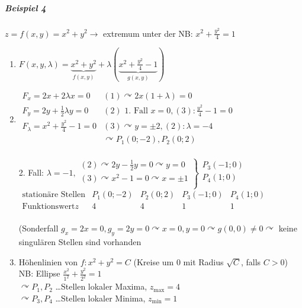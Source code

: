 \documentclass[a4paper]{scrartcl}
\begin{document}
\begin{enumerate}
\subparagraph{Beispiel 4} $z=f(x,y) = x^2 + y^2 \rightarrow$ extremum unter der NB: $x^2 + \frac{y^2}{4} = 1$
\begin{enumerate}
\item $F(x,y,\lambda) = \underbrace{x^2+y^2}_{f(x,y)} + \lambda (\underbrace{x^2 + \frac{y^2}{4} -1}_{g(x,y)})$
\item $\begin{array}{c|r}
F_x = 2x + 2\lambda x = 0 & (1) \curvearrowright 2x (1 + \lambda ) = 0\\
F_y = 2y + \frac{1}{2} \lambda y = 0 & (2) \text{ 1. Fall } x=0, (3): \frac{y^2}{4} -1 = 0\\
F_\lambda = x^2 + \frac{y^2}{4} -1 =0 & (3) \curvearrowright y = \pm 2, (2): \lambda = -4\\
 & \curvearrowright P_1(0;-2),P_2(0;2)\\
\end{array}$

2. Fall: $\lambda = -1, \left. \begin{array}{c} (2) \curvearrowright 2y - \frac{1}{2} y=0 \curvearrowright y=0 \\ (3) \curvearrowright x^2 -1 = 0 \curvearrowright x = \pm 1 \\ \end{array} \right \} \begin{array}{c} P_3(-1;0)\\ P_4(1;0)\\ \end{array} $\\

$\begin{array}{l|c|c|c|c}
\text{stationäre Stellen} & P_1(0;-2) & P_2(0;2) & P_3(-1;0) & P_4(1;0)\\ \hline
\text{Funktionswert} z & 4 & 4 & 1 & 1\\
\end{array}$

(Sonderfall $g_x= 2 x=0, g_y = 2y = 0 \curvearrowright x = 0, y=0 \curvearrowright g(0,0) \neq 0 \curvearrowright$ keine singulären Stellen sind vorhanden

\item Höhenlinien von $f: x^2 + y^2 = C$ (Kreise um 0 mit Radius $\sqrt{C}$, falls $C > 0$)\\
NB: Ellipse $\frac{x^2}{1^2} + \frac{y^2}{2^2} = 1$\\
$\curvearrowright P_1,P_2$ \dots Stellen lokaler Maxima, $z_\text{max} = 4$\\
$\curvearrowright P_3,P_4$ \dots Stellen lokaler Minima, $z_\text{min} = 1$


\end{enumerate}
\end{enumerate}
\end{document}
